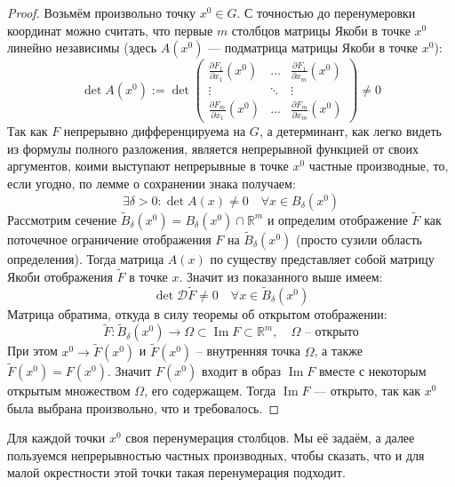 \documentclass[11pt]{article}
\DeclareMathOperator{\Imm}{Im}
\begin{document}
\begin{proof}
    Возьмём произвольно точку $x^0 \in G$. С точностью до перенумеровки 
    координат можно считать, что первые $m$ столбцов матрицы Якоби в 
    точке $x^0$ линейно независимы (здесь $A(x^0)$ --- подматрица матрицы Якоби в точке $x^0$): 
    \begin{equation*}
        \det A(x^0) := \det
        \begin{pmatrix}
            \displaystyle \frac{\partial F_1}{\partial x_1} \left(x^0 \right) & \ldots & \displaystyle \frac{\partial F_1}{\partial x_m} \left(x^0 \right) \\
            \displaystyle \vdots & \ddots & \vdots \\
            \displaystyle \frac{\partial F_m}{\partial x_1} \left(x^0 \right) & \ldots & \displaystyle \frac{\partial F_m}{\partial x_m} \left(x^0 \right)
        \end{pmatrix}
        \neq 0
    \end{equation*}
    Так как $F$ непрерывно дифференцируема на $G$, а детерминант, как легко видеть из формулы полного разложения, является непрерывной функцией от своих аргументов, коими выступают непрерывные в точке $x^0$ частные производные, 
    то, если угодно, по лемме о сохранении знака получаем:
    \[\exists \delta > 0: \det A(x) \neq 0 \quad \forall x \in B_{\delta}(x^0)\]
    Рассмотрим сечение $\widetilde{B}_{\delta}(x^0) = B_{\delta}(x^0) \cap 
    \mathbb{R}^m$ и определим 
    отображение $\widetilde{F}$ как поточечное ограничение отображения 
    $F$ на $\widetilde{B}_{\delta}(x^0)$ (просто сузили область определения). Тогда матрица $A(x)$ по существу представляет собой матрицу Якоби отображения $\widetilde{F}$ в точке $x$.
    Значит из показанного выше имеем:
    \[\det \mathcal{D} \widetilde{F} \neq 0 \quad \forall x \in 
    \widetilde{B}_{\delta}(x^0)\] 
    Матрица обратима, откуда в силу теоремы об открытом отображении:
    \[\widetilde{F} \colon \widetilde{B}_{\delta}(x^0) \to \Omega \subset \Imm F \subset \mathbb{R}^m, \quad \Omega \text{ -- открыто}\] 
    При этом $x^0 \to \widetilde{F}(x^0)$ и $\widetilde{F}(x^0)$ -- внутренняя точка $\Omega$, а также $\widetilde{F}(x^0) = F(x^0)$.
    Значит $F(x^0)$ входит в образ $\Imm F$ вместе с некоторым открытым множеством $\Omega$, его содержащем. 
    Тогда $\Imm F$ --- открыто, так как $x^0$ была выбрана произвольно, что и требовалось.
\end{proof}

\begin{remark}
    Для каждой точки $x^0$ своя перенумерация столбцов. Мы её задаём, а далее пользуемся непрерывностью частных производных, чтобы 
    сказать, что и для малой окрестности этой точки такая перенумерация подходит.
\end{remark}
\end{document}
